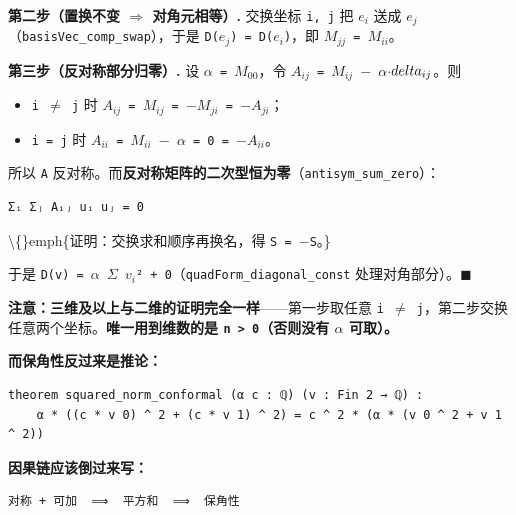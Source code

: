 \documentclass[11pt,a4paper]{ctexart}
\begin{document}
\textbf{第二步（置换不变 \ensuremath{\Longrightarrow} 对角元相等）.} 交换坐标 \texttt{i, j} 把 \texttt{\ensuremath{e_{i}}} 送成 \texttt{\ensuremath{e_{j}}}（\texttt{basisVec\_comp\_swap}），于是 \texttt{D(\ensuremath{e_{j}}) = D(\ensuremath{e_{i}})}，即 \texttt{\ensuremath{M_{jj}} = \ensuremath{M_{ii}}}。

\textbf{第三步（反对称部分归零）.} 设 \texttt{\ensuremath{\alpha} = \ensuremath{M_{00}}}，令 \texttt{\ensuremath{A_{ij}} = \ensuremath{M_{ij}} \ensuremath{-} \ensuremath{\alpha}\ensuremath{\cdot}\ensuremath{\\delta_{ij}}}。则

\begin{itemize}
\item \texttt{i \ensuremath{\ne} j} 时 \texttt{\ensuremath{A_{ij}} = \ensuremath{M_{ij}} = \ensuremath{-}\ensuremath{M_{ji}} = \ensuremath{-}\ensuremath{A_{ji}}}；
\item \texttt{i = j} 时 \texttt{\ensuremath{A_{ii}} = \ensuremath{M_{ii}} \ensuremath{-} \ensuremath{\alpha} = 0 = \ensuremath{-}\ensuremath{A_{ii}}}。
\end{itemize}

所以 \texttt{A} 反对称。而\textbf{反对称矩阵的二次型恒为零}（\texttt{antisym\_sum\_zero}）：

\begin{lstlisting}
Σᵢ Σⱼ Aᵢⱼ uᵢ uⱼ = 0
\end{lstlisting}

\textbackslash\{\}emph\{证明：交换求和顺序再换名，得 \texttt{S = \ensuremath{-}S}。\}

于是 \texttt{D(v) = \ensuremath{\alpha} \ensuremath{\Sigma} \ensuremath{v_{i}}² + 0}（\texttt{quadForm\_diagonal\_const} 处理对角部分）。\ensuremath{\ensuremath{\blacksquare}}

\textbf{注意：三维及以上与二维的证明完全一样}——第一步取任意 \texttt{i \ensuremath{\ne} j}，第二步交换任意两个坐标。\textbf{唯一用到维数的是 \texttt{n > 0}（否则没有 \ensuremath{\alpha} 可取）。}

\textbf{而保角性反过来是推论：}

\begin{lstlisting}
theorem squared_norm_conformal (α c : ℚ) (v : Fin 2 → ℚ) :
    α * ((c * v 0) ^ 2 + (c * v 1) ^ 2) = c ^ 2 * (α * (v 0 ^ 2 + v 1 ^ 2))
\end{lstlisting}

\textbf{因果链应该倒过来写：}

\begin{lstlisting}
对称 + 可加  ⟹  平方和  ⟹  保角性
\end{lstlisting}
\end{document}
